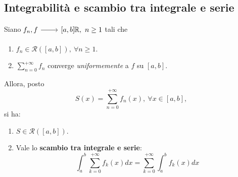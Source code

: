 \subsection{Integrabilità e scambio tra integrale e serie}
\begin{theorema}
	Siano $\funz{f_n,f}{\left[a,b\right]}{\realset},\ n\geq 1$ tali che
	\begin{enumerate}[label=\alph*.]
		\item $f_n\in\mathcal{R}\left(\left[a,b\right]\right),\ \forall n\geq 1$.
		\item $\displaystyle\sum_{n=0}^{+\infty}f_n$ converge \textit{uniformemente} a $f$ su $\left[a,b\right]$.
	\end{enumerate}
	Allora, posto
	\begin{equation*}
		 S(x)=\sum_{n=0}^{+\infty}f_n(x),\ \forall x\in \left[a,b\right],
	\end{equation*}
si ha:
	\begin{enumerate}
		\item $S\in\mathcal{R}\left(\left[a,b\right]\right)$.
		\item Vale lo \textbf{scambio tra integrale e serie}:
		\begin{equation}
			\int_{a}^{b}\sum_{k=0}^{+\infty}f_k(x)dx=\sum_{k=0}^{+\infty}\int_{a}^{b}f_k(x)dx
		\end{equation}
	\end{enumerate}
\end{theorema}
